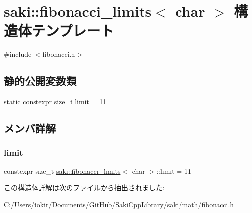 \hypertarget{structsaki_1_1fibonacci__limits_3_01char_01_4}{}\section{saki\+:\+:fibonacci\+\_\+limits$<$ char $>$ 構造体テンプレート}
\label{structsaki_1_1fibonacci__limits_3_01char_01_4}


{\ttfamily \#include $<$fibonacci.\+h$>$}

\subsection*{静的公開変数類}
\begin{DoxyCompactItemize}
\item 
static constexpr size\+\_\+t \mbox{\hyperlink{structsaki_1_1fibonacci__limits_3_01char_01_4_a7b546f9dbd7f81b0ff1f57bf2c67e103}{limit}} = 11
\end{DoxyCompactItemize}


\subsection{メンバ詳解}
\mbox{\label{structsaki_1_1fibonacci__limits_3_01char_01_4_a7b546f9dbd7f81b0ff1f57bf2c67e103}} 
\subsubsection{\texorpdfstring{limit}{limit}}
{\footnotesize\ttfamily constexpr size\+\_\+t \mbox{\hyperlink{structsaki_1_1fibonacci__limits}{saki\+::fibonacci\+\_\+limits}}$<$ char $>$\+::limit = 11\hspace{0.3cm}{\ttfamily [static]}}



この構造体詳解は次のファイルから抽出されました\+:\begin{DoxyCompactItemize}
\item 
C\+:/\+Users/tokir/\+Documents/\+Git\+Hub/\+Saki\+Cpp\+Library/saki/math/\mbox{\hyperlink{fibonacci_8h}{fibonacci.\+h}}\end{DoxyCompactItemize}

